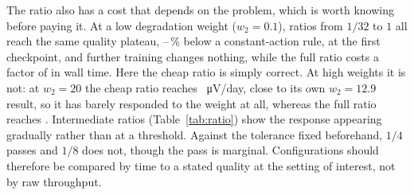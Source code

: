 \documentclass[conference]{IEEEtran}
\begin{document}
The ratio also has a cost that depends on the problem, which is worth knowing before paying it. At a low
degradation weight ($w_2=0.1$), ratios from $1/32$ to $1$ all reach the same quality plateau,
\NumEThreeShortfallMin--\NumEThreeShortfallMax\,\% below a constant-action rule, at the first checkpoint, and
further training changes nothing, while the full ratio costs a factor of \NumEThreeWallRatio{} in wall time. Here
the cheap ratio is simply correct. At high weights it is not: at $w_2=20$ the cheap ratio reaches
\NumChkTwentyLowDeg{}~\si{\micro\volt}/day, close to its own $w_2=12.9$ result, so it has barely responded to the
weight at all, whereas the full ratio reaches \NumChkTwentyHighDeg{}. Intermediate ratios (Table~\ref{tab:ratio})
show the response appearing gradually rather than at a threshold. Against the tolerance fixed beforehand, $1/4$
passes and $1/8$ does not, though the pass is marginal. Configurations should therefore be compared by time to a
stated quality at the setting of interest, not by raw throughput.

\begin{table}[t]
\caption{Update ratio at $w_2=20$, $\gamma=0.95$, 300k steps: mean of two seeds on every fifth \emph{training} day
(in-sample). The last column is degradation relative to the full ratio; the tolerance fixed in advance was $1.10$.}
\label{tab:ratio}
\centering
\footnotesize
\resizebox{\columnwidth}{!}{}
\end{table}
\end{document}
